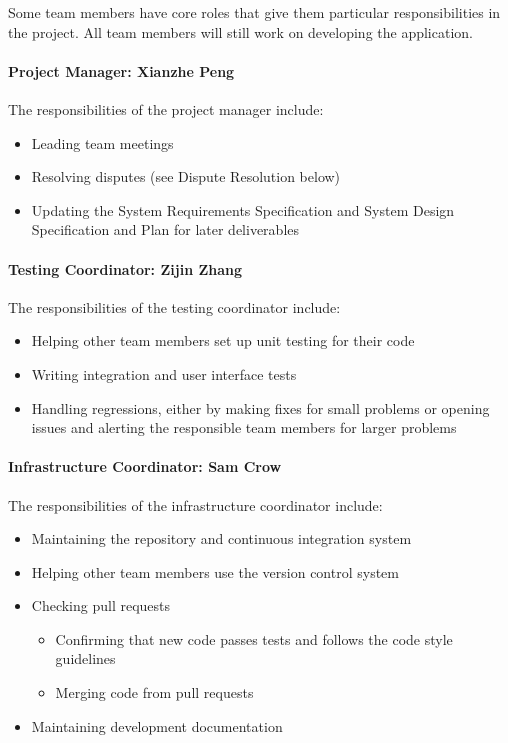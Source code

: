 \documentclass[10pt]{article}
\begin{document}
Some team members have core roles that give them particular responsibilities in the project.
All team members will still work on developing the application.

\paragraph{Project Manager: Xianzhe Peng}

The responsibilities of the project manager include:

\begin{itemize}
\item Leading team meetings
\item Resolving disputes (see Dispute Resolution below)
\item Updating the System Requirements Specification and System Design Specification and Plan
for later deliverables
\end{itemize}

\paragraph{Testing Coordinator: Zijin Zhang}

The responsibilities of the testing coordinator include:

\begin{itemize}
\item Helping other team members set up unit testing for their code
\item Writing integration and user interface tests
\item Handling regressions, either by making fixes for small problems or opening
issues and alerting the responsible team members for larger problems
\end{itemize}

\paragraph{Infrastructure Coordinator: Sam Crow}

The responsibilities of the infrastructure coordinator include:

\begin{itemize}
\item Maintaining the repository and continuous integration system
\item Helping other team members use the version control system
\item Checking pull requests
\begin{itemize}
    \item Confirming that new code passes tests and follows the code style guidelines
    \item Merging code from pull requests
\end{itemize}
\item Maintaining development documentation
\end{itemize}
\end{document}
